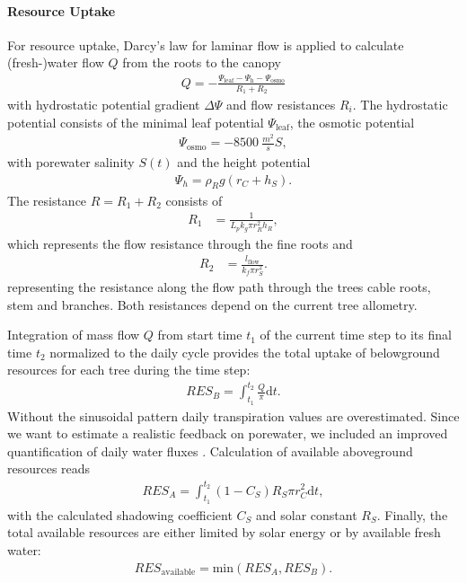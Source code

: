 \documentclass[manusscript, 12p, authoryear]{elsarticle}
\begin{document}
\paragraph{\textbf{Resource Uptake}}
For resource uptake, Darcy's law for laminar flow is applied to calculate (fresh-)water flow $Q$ from the roots to the canopy
\begin{align}
Q = -\frac{\Psi_{\text{leaf}}- \Psi_{\text{h}} -\Psi_{\text{osmo}}}{R_1 + R_2}
\end{align}
with hydrostatic potential gradient $\Delta \Psi$ and flow resistances $R_i$.
The hydrostatic potential consists of the minimal leaf potential $\Psi_{\text{leaf}}$, the osmotic potential 
\begin{align}
\Psi_{\text{osmo}}= -\SI{8500}{\frac{m^2}{s}}S,
\end{align}
with porewater salinity $S(t)$ and the height potential 
\begin{align}
\Psi_h = \rho_R g (r_C+h_S).
\end{align}
The resistance $R = R_1+R_2$ consists of
\begin{align}
R_1 &= \frac{1}{L_p k_g \pi r_R^2 h_R} ,\end{align}
which represents the flow resistance through the fine roots and 
\begin{align}
R_2 &= \frac{l_{\text{flow}}}{k_f \pi r_S^2}.
\end{align}
representing the resistance along the flow path through the trees cable roots, stem and branches.
Both resistances depend on the current tree allometry.

Integration of mass flow $Q$ from start time $t_1$ of the current time step to its final time $t_2$ normalized to the daily cycle provides the total uptake of belowground resources for each tree during the time step:
\begin{align}
RES_B = \int_{t_1}^{t_2} \frac{Q}{\pi} \mathrm{d}t.
\end{align}
Without the sinusoidal pattern daily transpiration values are overestimated. Since we want to estimate a realistic feedback on porewater, we included an improved quantification of daily water fluxes \citep{Peters2020}.
Calculation of available aboveground resources reads
\begin{align}
RES_A = \int_{t_1}^{t_2} (1-C_S) R_S \pi r_C^2 \mathrm{d}t,
\end{align}
with the calculated shadowing coefficient $C_S$ and solar constant $R_S$.
Finally, the total available resources are either limited by solar energy or by available fresh water:
\begin{align}
RES_{\text{available}} = \text{min}\left(RES_A, RES_B\right).
\end{align}
\end{document}
